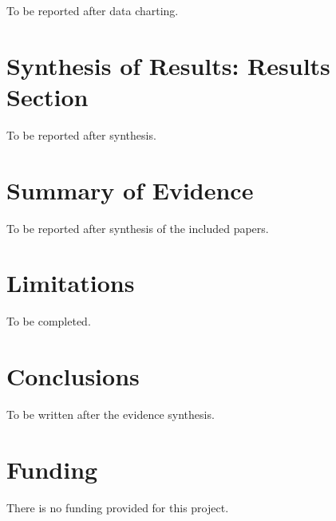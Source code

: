 \documentclass[journal]{IEEEtran}
\begin{document}
To be reported after data charting.

\section{Synthesis of Results: Results Section}

To be reported after synthesis.

\section{Summary of Evidence}

To be reported after synthesis of the included papers.

\section{Limitations}

To be completed.

\section{Conclusions}

To be written after the evidence synthesis.

\section{Funding}

There is no funding provided for this project.
\end{document}
